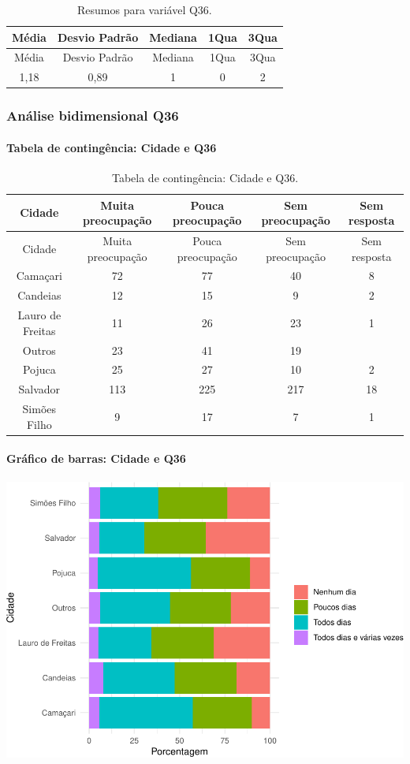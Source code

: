 \documentclass[]{article}
\let\oldparagraph\paragraph
\renewcommand{\paragraph}[1]{\oldparagraph{#1}\mbox{}}
\begin{document}
\begin{longtable}[]{@{}ccccc@{}}
\caption{\label{tab:unnamed-chunk-1310}Resumos para variável Q36.}\tabularnewline
\toprule
Média & Desvio Padrão & Mediana & 1Qua & 3Qua\tabularnewline
\midrule
\endfirsthead
\toprule
Média & Desvio Padrão & Mediana & 1Qua & 3Qua\tabularnewline
\midrule
\endhead
1,18 & 0,89 & 1 & 0 & 2\tabularnewline
\bottomrule
\end{longtable}

\cleardoublepage

\hypertarget{anuxe1lise-bidimensional-q36}{%
\subsubsection{Análise bidimensional Q36}\label{anuxe1lise-bidimensional-q36}}

\hypertarget{tabela-de-continguxeancia-cidade-e-q36}{%
\paragraph{Tabela de contingência: Cidade e Q36}\label{tabela-de-continguxeancia-cidade-e-q36}}

\begin{longtable}[]{@{}ccccc@{}}
\caption{\label{tab:unnamed-chunk-1311}Tabela de contingência: Cidade e Q36.}\tabularnewline
\toprule
Cidade & Muita preocupação & Pouca preocupação & Sem preocupação & Sem resposta\tabularnewline
\midrule
\endfirsthead
\toprule
Cidade & Muita preocupação & Pouca preocupação & Sem preocupação & Sem resposta\tabularnewline
\midrule
\endhead
Camaçari & 72 & 77 & 40 & 8\tabularnewline
Candeias & 12 & 15 & 9 & 2\tabularnewline
Lauro de Freitas & 11 & 26 & 23 & 1\tabularnewline
Outros & 23 & 41 & 19 &\tabularnewline
Pojuca & 25 & 27 & 10 & 2\tabularnewline
Salvador & 113 & 225 & 217 & 18\tabularnewline
Simões Filho & 9 & 17 & 7 & 1\tabularnewline
\bottomrule
\end{longtable}

\hypertarget{gruxe1fico-de-barras-cidade-e-q36}{%
\paragraph{Gráfico de barras: Cidade e Q36}\label{gruxe1fico-de-barras-cidade-e-q36}}

\begin{center}\includegraphics[width=0.75\linewidth]{relatorio_covid19_files/figure-latex/unnamed-chunk-1312-1} \end{center}
\end{document}
